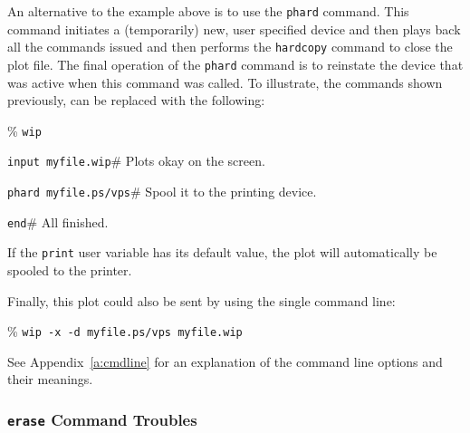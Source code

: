 An alternative to the example above is to use
the {\tt phard} command.
This command initiates a (temporarily) new, user specified device
and then plays back all the commands issued and then performs
the {\tt hardcopy} command to close the plot file.  The final
operation of the {\tt phard} command is to reinstate the device
that was active when this command was called.  To illustrate,
the commands shown previously, can be replaced with the following:
\begin{wiplist}%
  \item [\%] {\tt wip}
\samepage
  \item {\tt input myfile.wip}\hfill\# Plots okay on the screen.
  \item {\tt phard myfile.ps/vps}\hfill\# Spool it to the printing device.
  \item {\tt end}\hfill\# All finished.
\end{wiplist}
If the {\tt print} user variable has its default value,
the plot will automatically be spooled to the printer.

Finally, this plot could also be sent by using the single command line:
\begin{wiplist}%
  \item [\%] {\tt wip -x -d myfile.ps/vps myfile.wip}
\end{wiplist}
See Appendix~\ref{a:cmdline} for an explanation of the command
line options and their meanings.

\subsubsection*         {{\tt erase} Command Troubles}


